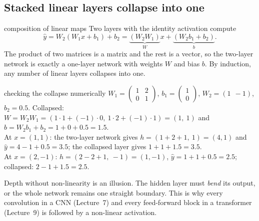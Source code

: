 \documentclass[11pt]{article}
\begin{document}
\subsection{Stacked linear layers collapse into one}\label{sec:collapse}
\begin{derivation}{composition of linear maps}
Two layers with the identity activation compute
\[\hat y=W_2(W_1x+b_1)+b_2=\underbrace{(W_2W_1)}_{W}x+\underbrace{(W_2b_1+b_2)}_{b}.\]
The product of two matrices is a matrix and the rest is a vector, so the two-layer network is exactly a one-layer network with weights $W$ and bias $b$. By induction, any number of linear layers collapses into one.
\end{derivation}
\begin{example}{checking the collapse numerically}
$W_1=\begin{pmatrix}1&2\\0&1\end{pmatrix}$, $b_1=\begin{pmatrix}1\\0\end{pmatrix}$, $W_2=(1\ \ -1)$, $b_2=0.5$. Collapsed: $W=W_2W_1=(1\cdot1+(-1)\cdot0,\ 1\cdot2+(-1)\cdot1)=(1,\ 1)$ and $b=W_2b_1+b_2=1+0+0.5=1.5$.\\
At $x=(1,1)$: the two-layer network gives $h=(1+2+1,\ 1)=(4,1)$ and $\hat y=4-1+0.5=3.5$; the collapsed layer gives $1+1+1.5=3.5$.\\
At $x=(2,-1)$: $h=(2-2+1,\ -1)=(1,-1)$, $\hat y=1+1+0.5=2.5$; collapsed: $2-1+1.5=2.5$.
\end{example}
\begin{keypoint}
Depth without non-linearity is an illusion. The hidden layer must \emph{bend} its output, or the whole network remains one straight boundary. This is why every convolution in a CNN (Lecture~7) and every feed-forward block in a transformer (Lecture~9) is followed by a non-linear activation.
\end{keypoint}
\end{document}
